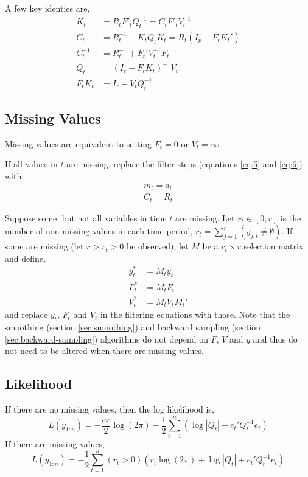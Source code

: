 \documentclass{article}\usepackage[]{graphicx}\usepackage[]{color}
\DeclareMathOperator{\E}{E}
\begin{document}
A few key identies \parencite[106-107]{WestHarrison1997} are,
\begin{align}
  K_{t} &= R_{t} F'_{t} Q_{t}^{-1} = C_{t} F'_{t} V_{t}^{-1} \\
  C_{t} &= R_{t}^{-1} - K_{t} Q_{t} K_{t} = R_{t}(I_{p} - F_{t} K_{t}') \\
  C_{t}^{-1} &= R_{t}^{-1} + F_{t}' V_{t}^{-1} F_{t} \\
  Q_{t} &= (I_{r} - F_{t} K_{t})^{-1} V_{t} \\
  F_{t} K_{t} &= I_{r} - V_{t} Q_{t}^{-1}
\end{align}

\subsection{Missing Values}

Missing values are equivalent to setting $F_{t} = 0$ or $V_{t} = \infty$.

If all values in $t$ are missing, replace the filter steps (equations \ref{eq:5} and \ref{eq:6}) with,
\begin{align}
  m_{t} = a_{t} \\
  C_{t} = R_{t} 
\end{align}

Suppose some, but not all variables in time $t$ are missing.
Let $r_{t} \in [0, r]$ is the number of non-missing values in each time period, $r_{t} = \sum_{j = 1}^{r} (y_{j,t} \neq \emptyset)$.
If some are missing (let $r > r_{t} > 0$ be observed), let $M$ be a $r_{t} \times r$ selection matrix and define,
\begin{align}
  y^{*}_{t} &= M_{t} y_{t} \\
  F^{*}_{t} &= M_{t} F_{t} \\
  V^{*}_{t} &= M_{t} V_{t} M_{t}'
\end{align}
and replace $y_{t}$, $F_{t}$ and $V_{t}$ in the filtering equations with those.
Note that the smoothing (section \ref{sec:smoothing}) and backward sampling (section \ref{sec:backward-sampling}) algorithms do not depend on $F$, $V$ and $y$ and thus do not need to be altered when there are missing values.


\subsection{Likelihood}
\label{sec:likelihood}

If there are no missing values, then the log likelihood is,
\begin{equation}
  L(y_{1:n}) =  - \frac{n r}{2} \log (2 \pi) - \frac{1}{2} \sum_{t=1}^{n}
  \left(
    \log | Q_{t} | + e_{t}' Q_{t}^{-1} e_{t}
  \right)
\end{equation}
If there are missing values,
\begin{equation}
  L(y_{1:n}) = 
  -\frac{1}{2} \sum_{t=1}^{n} 
  (r_{t} > 0) 
  \left(
    r_{t} \log (2 \pi)
    + \log | Q_{t} | + e_{t}' Q_{t}^{-1} e_{t}
  \right)
\end{equation}
\end{document}
